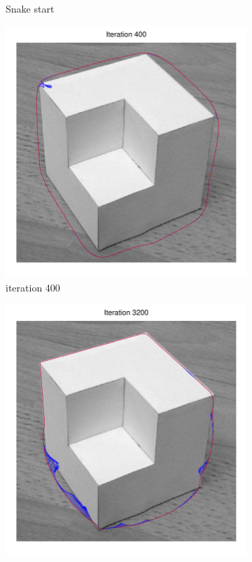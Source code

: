 \documentclass[11pt,a4paper]{article}
\begin{document}
\begin{figure}[H]
\begin{subfigure}[t]{0.24\textwidth}
        \caption{Snake start}
        \label{fig:cubic_log_grayscale}
    \end{subfigure}
    \begin{subfigure}[t]{0.24\textwidth}
        \includegraphics[width=\textwidth]{src/images/cubic_log_400.pdf}
        \caption{iteration 400}
        \label{fig:cubic_log_400}
    \end{subfigure}
    \begin{subfigure}[t]{0.24\textwidth}
        \includegraphics[width=\textwidth]{src/images/cubic_log_3200.pdf}

\end{subfigure}
\end{figure}
\end{document}
